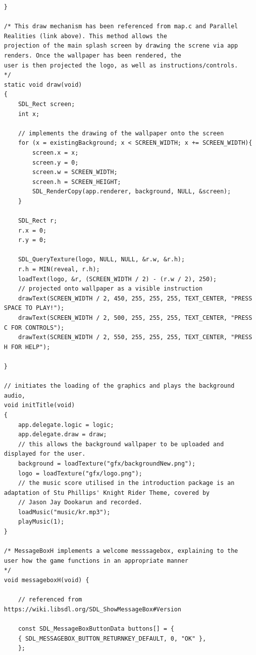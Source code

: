 \documentclass{article}
\begin{document}
\begin{lstlisting}
}

/* This draw mechanism has been referenced from map.c and Parallel Realities (link above). This method allows the
projection of the main splash screen by drawing the screne via app renders. Once the wallpaper has been rendered, the
user is then projected the logo, as well as instructions/controls.
*/
static void draw(void)
{
	SDL_Rect screen;
	int x;

	// implements the drawing of the wallpaper onto the screen
	for (x = existingBackground; x < SCREEN_WIDTH; x += SCREEN_WIDTH){
		screen.x = x;
		screen.y = 0;
		screen.w = SCREEN_WIDTH;
		screen.h = SCREEN_HEIGHT;
		SDL_RenderCopy(app.renderer, background, NULL, &screen);
	}

	SDL_Rect r;
	r.x = 0;
	r.y = 0;

	SDL_QueryTexture(logo, NULL, NULL, &r.w, &r.h);
	r.h = MIN(reveal, r.h);
	loadText(logo, &r, (SCREEN_WIDTH / 2) - (r.w / 2), 250);
	// projected onto wallpaper as a visible instruction
	drawText(SCREEN_WIDTH / 2, 450, 255, 255, 255, TEXT_CENTER, "PRESS SPACE TO PLAY!");
	drawText(SCREEN_WIDTH / 2, 500, 255, 255, 255, TEXT_CENTER, "PRESS C FOR CONTROLS");
	drawText(SCREEN_WIDTH / 2, 550, 255, 255, 255, TEXT_CENTER, "PRESS H FOR HELP");

}

// initiates the loading of the graphics and plays the background audio,
void initTitle(void)
{
	app.delegate.logic = logic;
	app.delegate.draw = draw;
	// this allows the background wallpaper to be uploaded and displayed for the user.
	background = loadTexture("gfx/backgroundNew.png");
	logo = loadTexture("gfx/logo.png");
	// the music score utilised in the introduction package is an adaptation of Stu Phillips' Knight Rider Theme, covered by
	// Jason Jay Dookarun and recorded.
	loadMusic("music/kr.mp3");
	playMusic(1);
}

/* MessageBoxH implements a welcome messsagebox, explaining to the user how the game functions in an appropriate manner
*/
void messageboxH(void) {

	// referenced from https://wiki.libsdl.org/SDL_ShowMessageBox#Version

	const SDL_MessageBoxButtonData buttons[] = {
	{ SDL_MESSAGEBOX_BUTTON_RETURNKEY_DEFAULT, 0, "OK" },
	};


\end{lstlisting}
\end{document}
